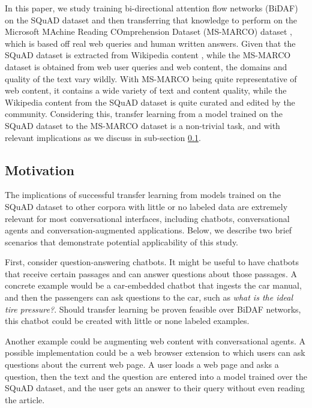 \documentclass[11pt,a4paper]{article}
\begin{document}
In this paper, we study training bi-directional attention flow networks (BiDAF) on the SQuAD dataset and then transferring that knowledge to perform on the Microsoft MAchine Reading COmprehension Dataset (MS-MARCO) dataset \cite{msmarco:2016}, which is based off real web queries and human written answers. Given that the SQuAD dataset is extracted from Wikipedia content \cite{squad:2016}, while the MS-MARCO dataset is obtained from web user queries and web content, the domains and quality of the text vary wildly. With MS-MARCO being quite representative of web content, it contains a wide variety of text and content quality, while the Wikipedia content from the SQuAD dataset is quite curated and edited by the community. Considering this, transfer learning from a model trained on the SQuAD dataset to the MS-MARCO dataset is a non-trivial task, and with relevant implications as we discuss in sub-section \ref{sec:motivation}.

\subsection{Motivation}
\label{sec:motivation}

The implications of successful transfer learning from models trained on the SQuAD dataset to other corpora with little or no labeled data are extremely relevant for most conversational interfaces, including chatbots, conversational agents and conversation-augmented applications. Below, we describe two brief scenarios that demonstrate potential applicability of this study.

First, consider question-answering chatbots. It might be useful to have chatbots that receive certain passages and can answer questions about those passages. A concrete example would be a car-embedded chatbot that ingests the car manual, and then the passengers can ask questions to the car, such as \textit{what is the ideal tire pressure?}. Should transfer learning be proven feasible over BiDAF networks, this chatbot could be created with little or none labeled examples.

Another example could be augmenting web content with conversational agents. A possible implementation could be a web browser extension to which users can ask questions about the current web page. A user loads a web page and asks a question, then the text and the question are entered into a model trained over the SQuAD dataset, and the user gets an answer to their query without even reading the article.
\end{document}

